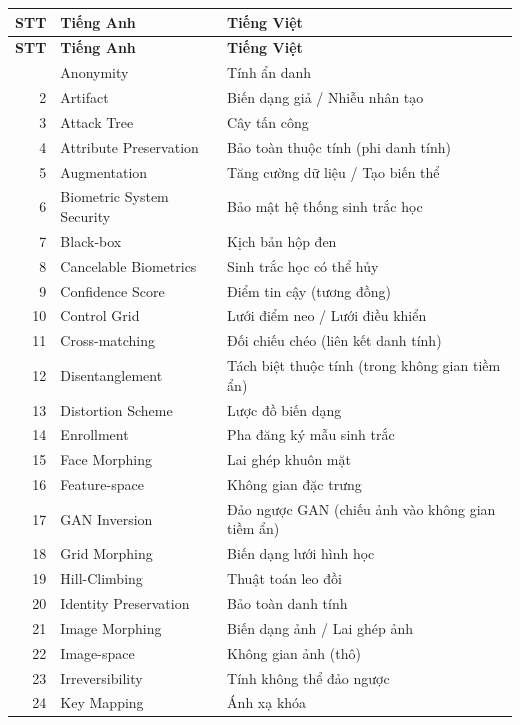 {\small
\begin{longtable}{r >{\raggedright\arraybackslash}p{5.2cm} >{\raggedright\arraybackslash}p{8.0cm}}
\toprule
\textbf{STT} & \textbf{Tiếng Anh} & \textbf{Tiếng Việt} \\
\midrule
\endfirsthead
\toprule
\textbf{STT} & \textbf{Tiếng Anh} & \textbf{Tiếng Việt} \\
\midrule
\endhead
\bottomrule
\endfoot
1 & Anonymity & Tính ẩn danh \\
2 & Artifact & Biến dạng giả / Nhiễu nhân tạo \\
3 & Attack Tree & Cây tấn công \\
4 & Attribute Preservation & Bảo toàn thuộc tính (phi danh tính) \\
5 & Augmentation & Tăng cường dữ liệu / Tạo biến thể \\
6 & Biometric System Security & Bảo mật hệ thống sinh trắc học \\
7 & Black-box & Kịch bản hộp đen \\
8 & Cancelable Biometrics & Sinh trắc học có thể hủy \\
9 & Confidence Score & Điểm tin cậy (tương đồng) \\
10 & Control Grid & Lưới điểm neo / Lưới điều khiển \\
11 & Cross-matching & Đối chiếu chéo (liên kết danh tính) \\
12 & Disentanglement & Tách biệt thuộc tính (trong không gian tiềm ẩn) \\
13 & Distortion Scheme & Lược đồ biến dạng \\
14 & Enrollment & Pha đăng ký mẫu sinh trắc \\
15 & Face Morphing & Lai ghép khuôn mặt \\
16 & Feature-space & Không gian đặc trưng \\
17 & GAN Inversion & Đảo ngược GAN (chiếu ảnh vào không gian tiềm ẩn) \\
18 & Grid Morphing & Biến dạng lưới hình học \\
19 & Hill-Climbing & Thuật toán leo đồi \\
20 & Identity Preservation & Bảo toàn danh tính \\
21 & Image Morphing & Biến dạng ảnh / Lai ghép ảnh \\
22 & Image-space & Không gian ảnh (thô) \\
23 & Irreversibility & Tính không thể đảo ngược \\
24 & Key Mapping & Ánh xạ khóa \\

\end{longtable}}
